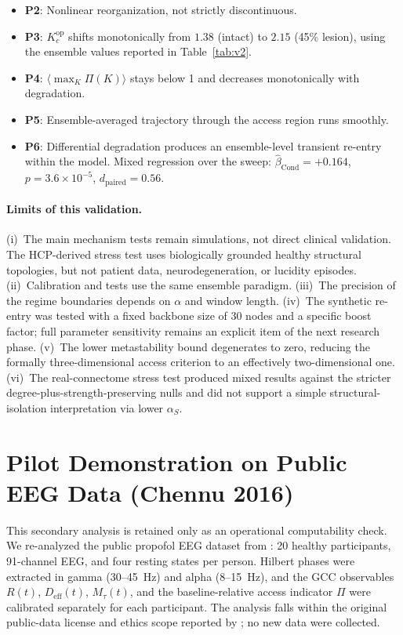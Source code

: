 \documentclass[11pt,a4paper]{article}
\theoremstyle{plain}
\theoremstyle{definition}
\theoremstyle{remark}
\begin{document}
\begin{itemize}
  \item \textbf{P2}: Nonlinear reorganization, not strictly discontinuous.
  \item \textbf{P3}: $K_c^{\mathrm{op}}$ shifts monotonically from $1.38$ (intact) to $2.15$ (45\% lesion), using the ensemble values reported in Table~\ref{tab:v2}.
  \item \textbf{P4}: $\langle\max_K \Pi(K)\rangle$ stays below 1 and decreases monotonically with degradation.
  \item \textbf{P5}: Ensemble-averaged trajectory through the access region runs smoothly.
  \item \textbf{P6}: Differential degradation produces an ensemble-level transient re-entry within the model. Mixed regression over the sweep: $\hat{\beta}_{\mathrm{Cond}} = +0.164$, $p = 3.6 \times 10^{-5}$, $d_{\mathrm{paired}} = 0.56$.
\end{itemize}

\paragraph{Limits of this validation.} (i)~The main mechanism tests remain simulations, not direct clinical validation. The HCP-derived stress test uses biologically grounded healthy structural topologies, but not patient data, neurodegeneration, or lucidity episodes. (ii)~Calibration and tests use the same ensemble paradigm. (iii)~The precision of the regime boundaries depends on $\alpha$ and window length. (iv)~The synthetic re-entry was tested with a fixed backbone size of 30 nodes and a specific boost factor; full parameter sensitivity remains an explicit item of the next research phase. (v)~The lower metastability bound degenerates to zero, reducing the formally three-dimensional access criterion to an effectively two-dimensional one. (vi)~The real-connectome stress test produced mixed results against the stricter degree-plus-strength-preserving nulls and did not support a simple structural-isolation interpretation via lower $\alpha_S$.


\section{Pilot Demonstration on Public EEG Data (Chennu 2016)}
\label{sec:pilot}

This secondary analysis is retained only as an operational computability check. We re-analyzed the public propofol EEG dataset from \citet{chennu2016}: 20 healthy participants, 91-channel EEG, and four resting states per person. Hilbert phases were extracted in gamma (30--45~Hz) and alpha (8--15~Hz), and the GCC observables $R(t)$, $D_{\mathrm{eff}}(t)$, $M_\tau(t)$, and the baseline-relative access indicator $\Pi$ were calibrated separately for each participant. The analysis falls within the original public-data license and ethics scope reported by \citet{chennu2016}; no new data were collected.
\end{document}
